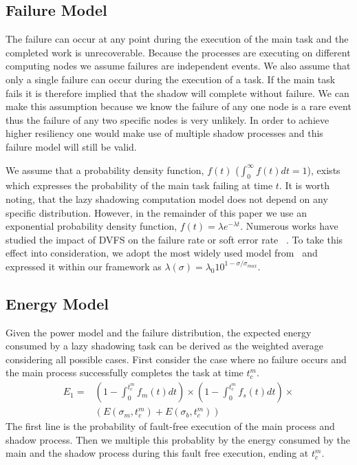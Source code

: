 \subsection{Failure Model}
\label{failure_model}

The failure can occur at any point during the execution of the main
task and the completed work is unrecoverable. Because the processes
are executing on different computing nodes we assume failures are
independent events. We also assume that only a single failure can
occur during the execution of a task. If the main task fails it is
therefore implied that the shadow will complete without failure. We
can make this assumption because we know the failure of any one node
is a rare event thus the failure of any two specific nodes is very
unlikely. In order to achieve higher resiliency one
would make use of multiple shadow processes and this failure model
will still be valid.

We assume that a probability density function, $f(t)$ ($\int_0^\infty
f(t)dt=1$), exists which expresses the probability of the main task
failing at time $t$. 
It is worth noting, that the lazy shadowing computation model 
does not depend on any specific distribution. However, in the remainder of this 
paper we use an exponential probability density function, $f(t) = \lambda e^{-\lambda t}$.
Numerous works have
studied the impact of DVFS on the failure rate or soft error rate
~\cite{firouzi2010reliability,zhu2004effects}. To take this effect into consideration,
we adopt the most widely used model from~\cite{zhu2004effects} and expressed it
within our framework as $\lambda(\sigma) = \lambda_0 10^{1-\sigma/\sigma_{max}}$. 



\subsection{Energy Model}
\label{energy_model}

Given the power model and the failure distribution, the expected
energy consumed by a lazy shadowing task can be derived as the weighted
average considering all possible cases. 
First consider the case where no failure occurs and the main process
successfully completes the task at time $t_c^m$.
\begin{equation}
\begin{split}
E_1 = &  ( 1-\int_0^{t_c^m}f_m(t)dt) \times (1 - \int_0^{t_c^m} f_s(t)dt) \times \\
      &  (  E(\sigma_m,t_c^m) + E(\sigma_b,t_c^m))
\label{eq:energy_no_failure}
\end{split}
\end{equation}
The first line is the probability of fault-free execution of the main
process and shadow process. Then we multiple this probablity by the
energy consumed by the main and the shadow process during this fault
free execution, ending at $t_c^m$.

